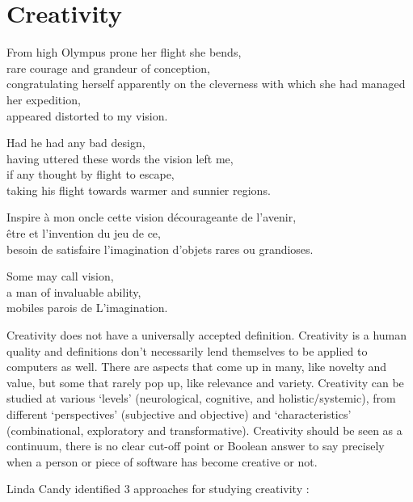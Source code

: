 
\chapter{Creativity}
\label{ch:creativity}

\startcontents[chapters]

\vfill

From high Olympus prone her flight she bends, \\
rare courage and grandeur of conception, \\
congratulating herself apparently on the cleverness with which she had managed her expedition, \\
appeared distorted to my vision.

Had he had any bad design, \\
having uttered these words the vision left me, \\
if any thought by flight to escape, \\
taking his flight towards warmer and sunnier regions.

Inspire à mon oncle cette vision décourageante de l'avenir, \\
être et l'invention du jeu de ce, \\
besoin de satisfaire l'imagination d'objets rares ou grandioses.

Some may call vision, \\
a man of invaluable ability, \\
mobiles parois de L'imagination.

\newpage
\minicontents
\spirals


Creativity does not have a universally accepted definition. Creativity is a human quality and definitions don't necessarily lend themselves to be applied to computers as well. There are aspects that come up in many, like novelty and value, but some that rarely pop up, like relevance and variety. Creativity can be studied at various `levels' (neurological, cognitive, and holistic/systemic), from different `perspectives' (subjective and objective) and `characteristics' (combinational, exploratory and transformative). Creativity should be seen as a continuum, there is no clear cut-off point or Boolean answer to say precisely when a person or piece of software has become creative or not.

Linda Candy identified 3 approaches for studying creativity \autocite[p.3]{Candy2012}:

